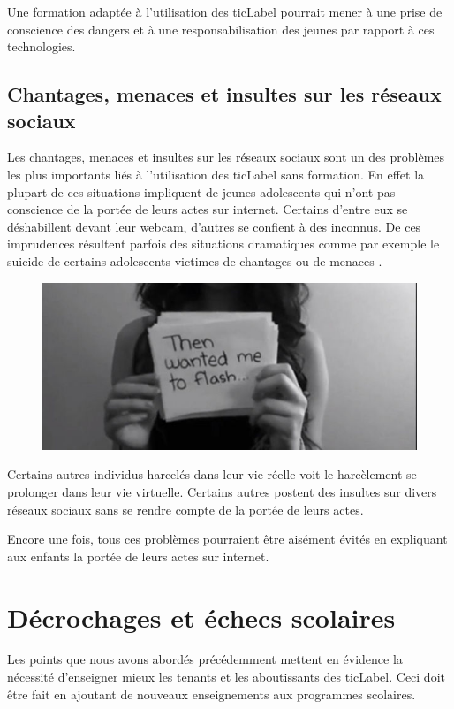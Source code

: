 Une formation adaptée à l'utilisation des \gls{ticLabel} pourrait mener à une prise de conscience des dangers et à une responsabilisation des jeunes par rapport à ces technologies.

\subsection{Chantages, menaces et insultes sur les réseaux sociaux}
Les chantages, menaces et insultes sur les réseaux sociaux sont un des problèmes les plus importants liés à l'utilisation des \gls{ticLabel} sans formation. En effet la plupart de ces situations impliquent de jeunes adolescents qui n'ont pas conscience de la portée de leurs actes sur internet. Certains d'entre eux se déshabillent devant leur webcam, d'autres se confient à des inconnus. De ces imprudences résultent parfois des situations dramatiques comme par exemple le suicide de certains adolescents victimes de chantages ou de menaces \cite{chantage_facebook, harcel_facebook}.

\begin{figure}[h]
\centering
\includegraphics[scale=1]{../resources/illustrations/Amanda_Todd}
\end{figure}

Certains autres individus harcelés dans leur vie réelle voit le harcèlement se prolonger dans leur vie virtuelle. Certains autres postent des insultes sur divers réseaux sociaux sans se rendre compte de la portée de leurs actes.

Encore une fois, tous ces problèmes pourraient être aisément évités en expliquant aux enfants la portée de leurs actes sur internet.



\section{Décrochages et échecs scolaires}
Les points que nous avons abordés précédemment mettent en évidence la nécessité d'enseigner mieux les tenants et les aboutissants des \gls{ticLabel}. Ceci doit être fait en ajoutant de nouveaux enseignements aux programmes scolaires.

